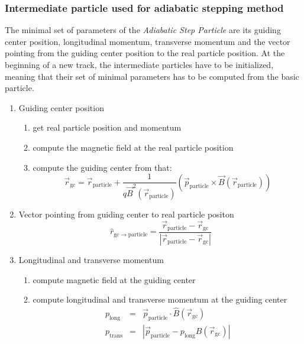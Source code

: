     \subsubsection*{Intermediate particle used for adiabatic stepping method}
    The minimal set of parameters of the \textit{Adiabatic Step Particle} are its guiding center position, longitudinal momentum, transverse momentum and the vector pointing from the guiding center position to the real particle position.
    At the beginning of a new track, the intermediate particles have to be initialized, meaning that their set of minimal parameters has to be computed from the basic particle.
        \begin{enumerate}
            \item Guiding center position
                \begin{enumerate}                              
                    \item get real particle position and momentum
                    \item compute the magnetic field at the real particle position
                    \item compute the guiding center from that:
                        \begin{equation}
                            \vec{r}_{\mathrm{gc}} = \vec{r}_{\mathrm{particle}} + \frac{1}{q \vec{B}^{2}(\vec{r}_{\mathrm{particle}})} \left( \vec{p}_{\mathrm{particle}}\times \vec{B}(\vec{r}_{\mathrm{particle}}) \right) 
                        \end{equation}
                \end{enumerate}
            \item Vector pointing from guiding center to real particle positon
            \begin{equation}
            \label{gctoparticlevector}
                \hat{r}_{\mathrm{gc \rightarrow particle}} = \frac{\vec{r}_{\mathrm{particle}} - \vec{r}_{\mathrm{gc}}}{|\vec{r}_{\mathrm{particle}} - \vec{r}_{\mathrm{gc}}|}
            \end{equation}
            \item Longitudinal and transverse momentum
                \begin{enumerate}
                    \item compute magnetic field at the guiding center
                    \item compute longitudinal and transverse momentum at the guiding center
        	            \begin{eqnarray}
                        \label{plongptrans}
                            p_{\mathrm{long}} &=& \vec{p}_{\mathrm{particle}} \cdot \hat{B}(\vec{r}_{\mathrm{gc}}) \\
                            p_{\mathrm{trans}} &=& |\vec{p}_{\mathrm{particle}} - p_{\mathrm{long}} \hat{B}(\vec{r}_{\mathrm{gc}})|
                        \end{eqnarray}
                \end{enumerate}
        \end{enumerate}
       
